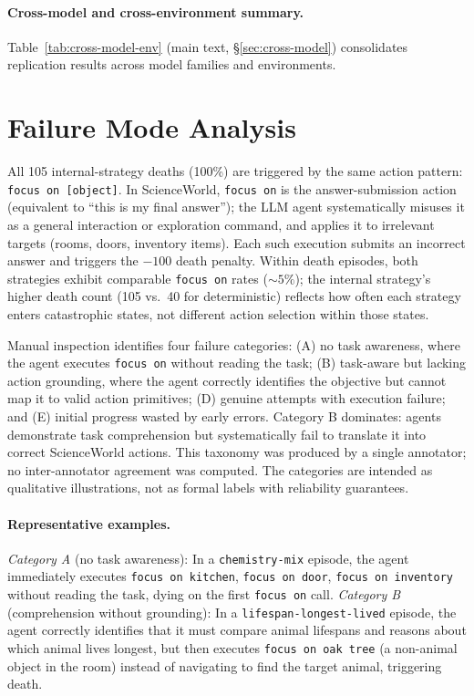 \documentclass[11pt]{article}
\begin{document}
\paragraph{Cross-model and cross-environment summary.}
Table~\ref{tab:cross-model-env} (main text, \S\ref{sec:cross-model}) consolidates replication results across model families and environments.

\section{Failure Mode Analysis}
\label{app:failure-modes}

All 105 internal-strategy deaths (100\%) are triggered by the same action pattern: \texttt{focus on [object]}. In ScienceWorld, \texttt{focus on} is the answer-submission action (equivalent to ``this is my final answer''); the LLM agent systematically misuses it as a general interaction or exploration command, and applies it to irrelevant targets (rooms, doors, inventory items). Each such execution submits an incorrect answer and triggers the $-100$ death penalty. Within death episodes, both strategies exhibit comparable \texttt{focus on} rates (${\sim}5\%$); the internal strategy's higher death count (105 vs.\ 40 for deterministic) reflects how often each strategy enters catastrophic states, not different action selection within those states.

Manual inspection identifies four failure categories: (A) no task awareness, where the agent executes \texttt{focus on} without reading the task; (B) task-aware but lacking action grounding, where the agent correctly identifies the objective but cannot map it to valid action primitives; (D) genuine attempts with execution failure; and (E) initial progress wasted by early errors. Category B dominates: agents demonstrate task comprehension but systematically fail to translate it into correct ScienceWorld actions. This taxonomy was produced by a single annotator; no inter-annotator agreement was computed. The categories are intended as qualitative illustrations, not as formal labels with reliability guarantees.
\label{tab:death-taxonomy}

\paragraph{Representative examples.}
\emph{Category A} (no task awareness): In a \texttt{chemistry-mix} episode, the agent immediately executes \texttt{focus on kitchen}, \texttt{focus on door}, \texttt{focus on inventory} without reading the task, dying on the first \texttt{focus on} call. \emph{Category B} (comprehension without grounding): In a \texttt{lifespan-longest-lived} episode, the agent correctly identifies that it must compare animal lifespans and reasons about which animal lives longest, but then executes \texttt{focus on oak tree} (a non-animal object in the room) instead of navigating to find the target animal, triggering death.
\end{document}
